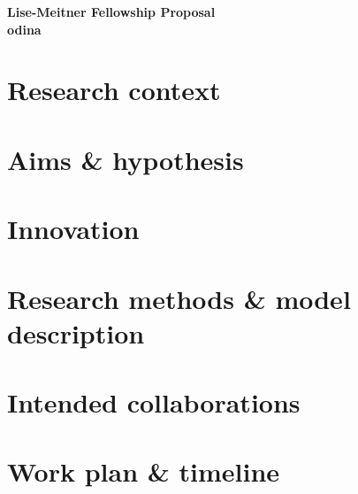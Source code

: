 \documentclass[11pt, a4paper, oneside, article]{memoir}
\begin{document}
\setlength{\baselineskip}{15pt}         %



\begin{center}
   \vspace*{-3\baselineskip}
    \huge
    \textbf{Lise-Meitner Fellowship Proposal}\\
    \vspace{0.5\baselineskip}
    \LARGE   
    \textbf{\gls{odina}}
    \vspace{0.5\baselineskip}
    \glsresetall
    \normalsize
    \tableofcontents*
\end{center}

\chapter{Research context}
\label{c:context}


\chapter{Aims \& hypothesis}
\label{c:aim_hyp}


\chapter{Innovation}
\label{c:innovation}


\vspace{-0.5\baselineskip}
\chapter{Research methods \& model description}
\label{c:methods}


\newpage
\chapter{Intended collaborations}
\label{c:collab}


\vspace{-.5\baselineskip}
\chapter{Work plan \& timeline}
\label{c:project_plan}

\end{document}
